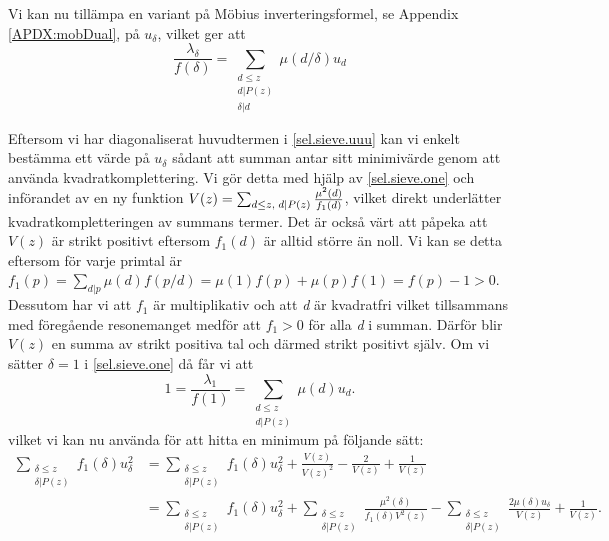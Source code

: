 Vi kan nu tillämpa en variant på Möbius inverteringsformel, se Appendix \ref{APDX:mobDual}, på \(u_\delta\), vilket ger att
\begin{equation}
    \frac{\lambda_\delta}{f(\delta)} = \sum_{\substack{d\leq z\\d|P(z)\\\delta|d}} \mu(d/\delta)u_d \label{sel.sieve.one}
\end{equation}

Eftersom vi har diagonaliserat huvudtermen i \eqref{sel.sieve.uuu} kan vi enkelt bestämma ett värde på \(u_\delta\) sådant att summan antar sitt minimivärde genom att använda kvadratkomplettering. 
Vi gör detta med hjälp av \eqref{sel.sieve.one} och införandet av en ny funktion \(V(z) = \sum_{d\leq z,\; d\mid P(z)}\frac{\mu^2(d)}{f_1(d)}\), vilket direkt underlätter kvadratkompletteringen av summans termer. 
Det är också värt att påpeka att \(V(z)\) är strikt positivt eftersom \(f_1(d)\) är alltid större än noll. 
Vi kan se detta eftersom för varje primtal är \(f_1(p) = \sum_{d|p}\mu(d)f({p}/{d}) = \mu(1)f(p) + \mu(p)f(1) = f(p) - 1 > 0\).
Dessutom har vi att \(f_1\) är multiplikativ och att \textit{d} är kvadratfri vilket tillsammans med föregående resonemanget medför att \(f_1 > 0\) för alla \textit{d} i summan. 
Därför blir \(V(z)\) en summa av strikt positiva tal och därmed strikt positivt själv.
Om vi sätter \(\delta = 1\) i \eqref{sel.sieve.one} då får vi att
\begin{equation}
    1 = \frac{\lambda_1}{f(1)} = \sum_{\substack{d\leq z\\ d|P(z)}}\mu(d)u_d.\nonumber
\end{equation}
vilket vi kan nu använda för att hitta en minimum på följande sätt:
\begin{align}
    \sum_{\substack{\delta \leq z\\ \delta | P(z)}}f_1(\delta) u_\delta^2 &= \sum_{\substack{\delta\leq z\\\delta|P(z)}} f_1(\delta)u_\delta^2 + \frac{V(z)}{V(z)^2} - \frac{2}{V(z)} + \frac{1}{V(z)}\nonumber\\
    &= \sum_{\substack{\delta\leq z\\\delta|P(z)}} f_1(\delta)u_\delta^2 + \sum_{\substack{\delta\leq z\\ \delta|P(z)}}\frac{\mu^2(\delta)}{f_1(\delta)V^2(z)} - \sum_{\substack{\delta\leq z\\\delta |P(z)}}\frac{2\mu(\delta)u_\delta}{V(z)} + \frac{1}{V(z)}.\label{sel.sieve.VVV}
\end{align}

